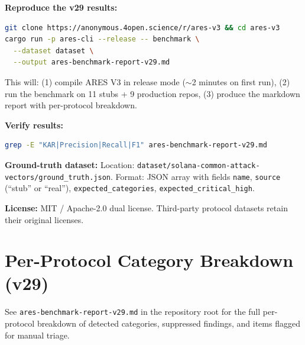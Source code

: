 \documentclass{article}
\begin{document}
\textbf{Reproduce the v29 results:}

\begin{lstlisting}[language=bash]
git clone https://anonymous.4open.science/r/ares-v3 && cd ares-v3
cargo run -p ares-cli --release -- benchmark \
  --dataset dataset \
  --output ares-benchmark-report-v29.md
\end{lstlisting}

This will: (1) compile ARES V3 in release mode ($\sim$2 minutes on first run), (2) run the benchmark on 11 stubs + 9 production repos, (3) produce the markdown report with per-protocol breakdown.

\textbf{Verify results:}

\begin{lstlisting}[language=bash]
grep -E "KAR|Precision|Recall|F1" ares-benchmark-report-v29.md
\end{lstlisting}

\textbf{Ground-truth dataset:} Location: \texttt{dataset/solana-common-attack-vectors/ground\_truth.json}. Format: JSON array with fields \texttt{name}, \texttt{source} (``stub'' or ``real''), \texttt{expected\_categories}, \texttt{expected\_critical\_high}.

\textbf{License:} MIT / Apache-2.0 dual license. Third-party protocol datasets retain their original licenses.

\section{Per-Protocol Category Breakdown (v29)}
\label{sec:breakdown}

See \texttt{ares-benchmark-report-v29.md} in the repository root for the full per-protocol breakdown of detected categories, suppressed findings, and items flagged for manual triage.
\end{document}
